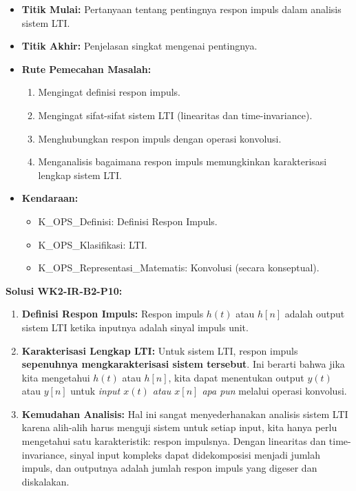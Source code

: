 \documentclass[
  letterpaper,
  DIV=11,
  numbers=noendperiod]{scrreprt}
\providecommand{\tightlist}{%
  \setlength{\itemsep}{0pt}\setlength{\parskip}{0pt}}
\begin{document}
\begin{itemize}
\tightlist
\item
  \textbf{Titik Mulai:} Pertanyaan tentang pentingnya respon impuls
  dalam analisis sistem LTI.
\item
  \textbf{Titik Akhir:} Penjelasan singkat mengenai pentingnya.
\item
  \textbf{Rute Pemecahan Masalah:}

  \begin{enumerate}
  \def\labelenumi{\arabic{enumi}.}
  \tightlist
  \item
    Mengingat definisi respon impuls.
  \item
    Mengingat sifat-sifat sistem LTI (linearitas dan time-invariance).
  \item
    Menghubungkan respon impuls dengan operasi konvolusi.
  \item
    Menganalisis bagaimana respon impuls memungkinkan karakterisasi
    lengkap sistem LTI.
  \end{enumerate}
\item
  \textbf{Kendaraan:}

  \begin{itemize}
  \tightlist
  \item
    K\_OPS\_Definisi: Definisi Respon Impuls.
  \item
    K\_OPS\_Klasifikasi: LTI.
  \item
    K\_OPS\_Representasi\_Matematis: Konvolusi (secara konseptual).
  \end{itemize}
\end{itemize}

\textbf{Solusi WK2-IR-B2-P10:}

\begin{enumerate}
\def\labelenumi{\arabic{enumi}.}
\tightlist
\item
  \textbf{Definisi Respon Impuls:} Respon impuls \(h(t)\) atau \(h[n]\)
  adalah output sistem LTI ketika inputnya adalah sinyal impuls unit.
\item
  \textbf{Karakterisasi Lengkap LTI:} Untuk sistem LTI, respon impuls
  \textbf{sepenuhnya mengkarakterisasi sistem tersebut}. Ini berarti
  bahwa jika kita mengetahui \(h(t)\) atau \(h[n]\), kita dapat
  menentukan output \(y(t)\) atau \(y[n]\) untuk \emph{input \(x(t)\)
  atau \(x[n]\) apa pun} melalui operasi konvolusi.
\item
  \textbf{Kemudahan Analisis:} Hal ini sangat menyederhanakan analisis
  sistem LTI karena alih-alih harus menguji sistem untuk setiap input,
  kita hanya perlu mengetahui satu karakteristik: respon impulsnya.
  Dengan linearitas dan time-invariance, sinyal input kompleks dapat
  didekomposisi menjadi jumlah impuls, dan outputnya adalah jumlah
  respon impuls yang digeser dan diskalakan.
\end{enumerate}
\end{document}
